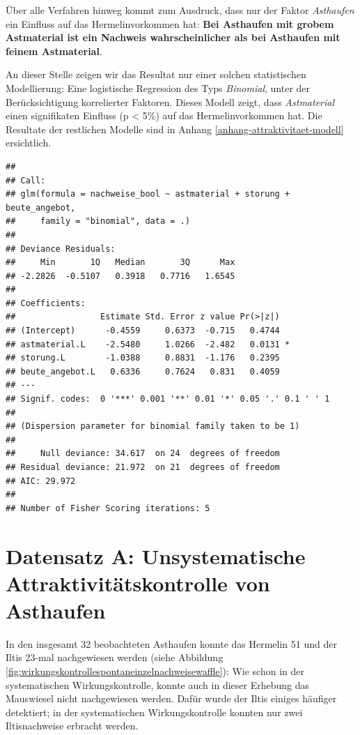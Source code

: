 \documentclass[
  oneside]{scrbook}
\begin{document}
Über alle Verfahren hinweg kommt zum Ausdruck, dass nur der Faktor \emph{Asthaufen} ein Einfluss auf das Hermelinvorkommen hat: \textbf{Bei Asthaufen mit grobem Astmaterial ist ein Nachweis wahrscheinlicher als bei Asthaufen mit feinem Astmaterial}.

An dieser Stelle zeigen wir das Resultat nur einer solchen statistischen Modellierung: Eine logistische Regression des Typs \emph{Binomial}, unter der Berücksichtigung korrelierter Faktoren. Dieses Modell zeigt, dass \emph{Astmaterial} einen signifikaten Einfluss (p \textless{} 5\%) auf das Hermelinvorkommen hat. Die Resultate der restlichen Modelle sind in Anhang \ref{anhang-attraktivitaet-modell} ersichtlich.

\begin{verbatim}
## 
## Call:
## glm(formula = nachweise_bool ~ astmaterial + storung + beute_angebot, 
##     family = "binomial", data = .)
## 
## Deviance Residuals: 
##     Min       1Q   Median       3Q      Max  
## -2.2826  -0.5107   0.3918   0.7716   1.6545  
## 
## Coefficients:
##                 Estimate Std. Error z value Pr(>|z|)  
## (Intercept)      -0.4559     0.6373  -0.715   0.4744  
## astmaterial.L    -2.5480     1.0266  -2.482   0.0131 *
## storung.L        -1.0388     0.8831  -1.176   0.2395  
## beute_angebot.L   0.6336     0.7624   0.831   0.4059  
## ---
## Signif. codes:  0 '***' 0.001 '**' 0.01 '*' 0.05 '.' 0.1 ' ' 1
## 
## (Dispersion parameter for binomial family taken to be 1)
## 
##     Null deviance: 34.617  on 24  degrees of freedom
## Residual deviance: 21.972  on 21  degrees of freedom
## AIC: 29.972
## 
## Number of Fisher Scoring iterations: 5
\end{verbatim}

\hypertarget{datensatz-a-unsystematische-attraktivituxe4tskontrolle-von-asthaufen-1}{%
\section{Datensatz A: Unsystematische Attraktivitätskontrolle von Asthaufen}\label{datensatz-a-unsystematische-attraktivituxe4tskontrolle-von-asthaufen-1}}

In den insgesamt 32 beobachteten Asthaufen konnte das Hermelin 51 und der Iltis 23-mal nachgewiesen werden (siehe Abbildung \ref{fig:wirkungskontrollespontaneinzelnachweisewaffle}): Wie schon in der systematischen Wirkungskontrolle, konnte auch in dieser Erhebung das Mauswiesel nicht nachgewiesen werden. Dafür wurde der Iltis einiges häufiger detektiert; in der systematischen Wirkungskontrolle konnten nur zwei Iltisnachweise erbracht werden.
\end{document}
